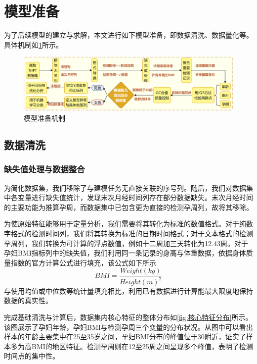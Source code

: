 \section{模型准备}

为了后续模型的建立与求解，本文进行如下模型准备，即数据清洗、数据量化等。具体机制如\cref{fig:模型准备机制}所示。

\begin{figure}[h!]
\centering
\includegraphics[width=1\textwidth]{figs/2模型准备/模型准备.pdf}
\caption{模型准备机制}
\label{fig:模型准备机制}
\end{figure}

\subsection{数据清洗}

\subsubsection{缺失值处理与数据整合}
为简化数据集，我们移除了与建模任务无直接关联的序号列。随后，我们对数据集中各变量进行缺失值统计，发现末次月经时间列存在部分数据缺失。末次月经时间的主要功能为推算孕周，而数据集中已包含更为直接的检测孕周列，故将其移除。

为使原始特征能够用于定量分析，我们需要将其转化为标准的数值格式。对于纯数字格式的检测时间列，我们将其转换为标准的日期时间格式；对于文本格式的检测孕周列，我们转换为可计算的浮点数值，例如十二周加三天转化为12.43周。对于孕妇BMI指标列中的缺失值，我们利用同一条记录的身高与体重数据，依据身体质量指数的官方计算公式进行填充，该公式如下所示
\begin{equation}
BMI = \frac{Weight(kg)}{Height(m)^2}
\label{eq:bmi}
\end{equation}
与使用均值或中位数等统计量填充相比，利用已有数据进行计算能最大限度地保持数据的真实性。



完成基础清洗与计算后，数据集内核心特征的整体分布如\cref{fig:核心特征分布}所示。该图展示了孕妇年龄，孕妇BMI与检测孕周三个变量的分布状况。从图中可以看出样本的年龄主要集中在25至35岁之间，孕妇BMI分布的峰值位于30附近，证实了样本多为高BMI的地区特征。检测孕周则在12至25周之间呈现多个峰值，表明了检测时间点的集中性。

